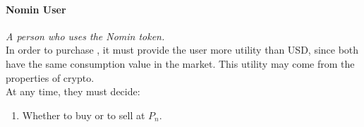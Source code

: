 \paragraph{Nomin User}
\emph{A person who uses the Nomin token.} \\
 
\noindent In order to purchase \NOM{}, it must provide the user more utility than USD, since both have the same consumption value in the market. This utility may come from the properties of crypto. \\

\noindent At any time, they must decide: 
\begin{enumerate}
\item{Whether to buy or to sell \NOM{} at $P_n$.}
\end{enumerate}

\newpage